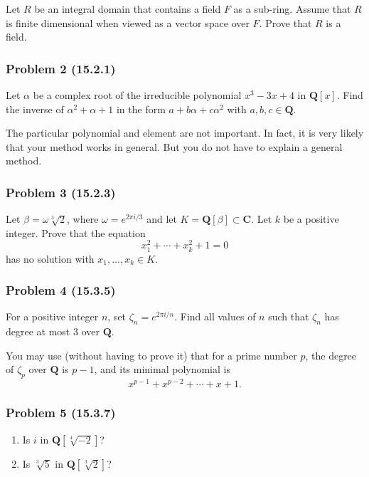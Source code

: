 \documentclass[11pt]{article}
\begin{document}
Let \(R\) be an integral domain that contains a field \(F\) as a sub-ring.
Assume that \(R\) is finite dimensional when viewed as a vector space over \(F\).
Prove that \(R\) is a field.
\subsubsection{Problem 2 (15.2.1)}
\label{sec:org97a4eed}

Let \(\alpha\) be a complex root of the irreducible polynomial \(x^{3}-3x+4\) in \(\mathbf{Q}[x]\).
Find the inverse of \(\alpha^2+\alpha+1\) in the form \(a + b \alpha + c \alpha^{2}\) with \(a, b, c \in \mathbf{Q}\).

The particular polynomial and element are not important.
In fact, it is very likely that your method works in general.
But you do not have to explain a general method.
\subsubsection{Problem 3 (15.2.3)}
\label{sec:org9e4c22e}

Let \(\beta = \omega \sqrt[3]{2}\), where \(\omega = e^{2\pi i / 3}\) and let \(K = \mathbf{Q}[\beta] \subset \mathbf{C}\).
Let \(k\) be a positive integer.
Prove that the equation
\[ x_1^2 + \cdots + x_k^2 + 1 = 0\]
has no solution with \(x_1, \dots, x_{k} \in K\).
\subsubsection{Problem 4 (15.3.5)}
\label{sec:orgc7695cf}
For a positive integer \(n\), set \(\zeta_{n} = e^{2\pi i / n}\).
Find all values of \(n\) such that \(\zeta_{n}\) has degree at most 3 over \(\mathbf{Q}\).

You may use (without having to prove it) that for a prime number \(p\), the degree of \(\zeta_p\) over \(\mathbf{Q}\) is \(p-1\), and its minimal polynomial is
\[x^{p-1}+ x^{p-2} + \cdots + x + 1.\]
\subsubsection{Problem 5 (15.3.7)}
\label{sec:org2af4cd5}

\begin{enumerate}
\item Is \(i\) in \(\mathbf{Q}[\sqrt[4]{-2}]\)?
\item Is \(\sqrt[3]5\) in \(\mathbf{Q}[\sqrt[3]2]\)?
\end{enumerate}
\end{document}
